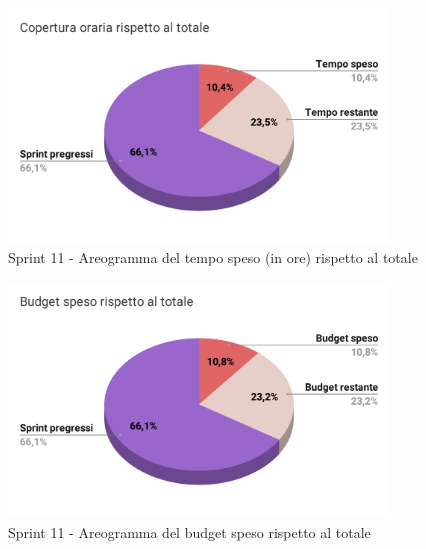   \begin{figure}[H]
    \centering
    \includegraphics[width=0.90\textwidth]{assets/Consuntivo/Sprint-11/copertura_oraria.pdf}
    \caption{Sprint 11 - Areogramma del tempo speso (in ore) rispetto al totale}
  \end{figure}

  \begin{figure}[H]
    \centering
    \includegraphics[width=0.90\textwidth]{assets/Consuntivo/Sprint-11/budget_speso.pdf}
    \caption{Sprint 11 - Areogramma del budget speso rispetto al totale}
  \end{figure}

